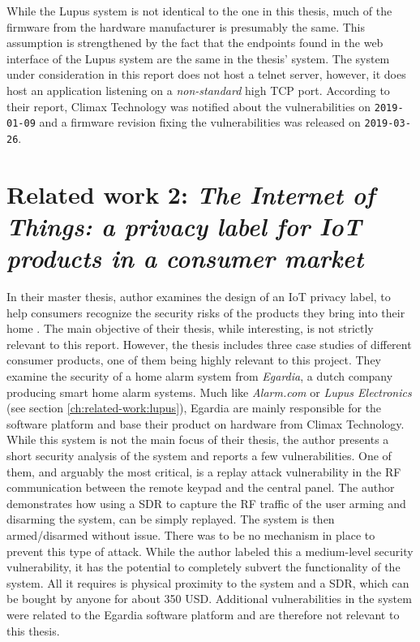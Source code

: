 While the Lupus system is not identical to the one in this thesis, much of the firmware from the hardware manufacturer is presumably the same. This assumption is strengthened by the fact that the endpoints found in the web interface of the Lupus system are the same in the thesis' system. The system under consideration in this report does not host a telnet server, however, it does host an application listening on a \textit{non-standard} high TCP port. According to their report, Climax Technology was notified about the vulnerabilities on \texttt{2019-01-09} and a firmware revision fixing the vulnerabilities was released on \texttt{2019-03-26}.

\section{Related work 2: \textit{The Internet of Things: a privacy label for IoT products in a consumer market}}
In their master thesis, author \citeauthor{iotprivacylabel} examines the design of an IoT privacy label, to help consumers recognize the security risks of the products they bring into their home \cite{iotprivacylabel}. The main objective of their thesis, while interesting, is not strictly relevant to this report. However, the thesis includes three case studies of different consumer products, one of them being highly relevant to this project. They examine the security of a home alarm system from \textit{Egardia}, a dutch company producing smart home alarm systems. Much like \textit{Alarm.com} or \textit{Lupus Electronics} (see section \ref{ch:related-work:lupus}), Egardia are mainly responsible for the software platform and base their product on hardware from Climax Technology. While this system is not the main focus of their thesis, the author presents a short security analysis of the system and reports a few vulnerabilities. One of them, and arguably the most critical, is a replay attack vulnerability in the \gls{RF} communication between the remote keypad and the central panel. The author demonstrates how using a \gls{SDR} to capture the \gls{RF} traffic of the user arming and disarming the system, can be simply replayed. The system is then armed/disarmed without issue. There was to be no mechanism in place to prevent this type of attack. While the author labeled this a medium-level security vulnerability, it has the potential to completely subvert the functionality of the system. All it requires is physical proximity to the system and a \gls{SDR}, which can be bought by anyone for about 350 USD. Additional vulnerabilities in the system were related to the Egardia software platform and are therefore not relevant to this thesis.

